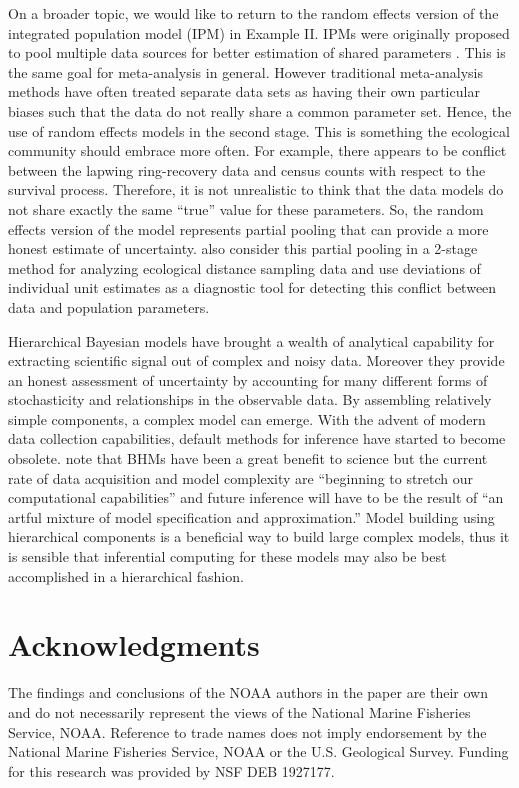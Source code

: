 \documentclass[12pt]{article}
\begin{document}
On a broader topic, we would like to return to the random effects version of the integrated population model (IPM) in Example II. IPMs were originally proposed to pool multiple data sources for better estimation of shared parameters \citep{schaub2011integrated}. This is the same goal for meta-analysis in general. However traditional meta-analysis methods have often treated separate data sets as having their own particular biases such that the data do not really share a common parameter set. Hence, the use of random effects models in the second stage. This is something the ecological community should embrace more often. For example, there appears to be conflict between the lapwing ring-recovery data and census counts with respect to the survival process. Therefore, it is not unrealistic to think that the data models do not share exactly the same ``true'' value for these parameters. So, the random effects version of the model represents partial pooling that can provide a more honest estimate of uncertainty. \cite{bravington2018reliable} also consider this partial pooling in a 2-stage method for analyzing ecological distance sampling data and use deviations of individual unit estimates as a diagnostic tool for detecting this conflict between data and population parameters. 

Hierarchical Bayesian models have brought a wealth of analytical capability for extracting scientific signal out of complex and noisy data. Moreover they provide an honest assessment of uncertainty by accounting for many different forms of stochasticity and relationships in the observable data. By assembling relatively simple components, a complex model can emerge. With the advent of modern data collection capabilities, default methods for inference have started to become obsolete. \citet{gelfand2015hierarchical} note that BHMs have been a great benefit to science but the current rate of data acquisition and model complexity are ``beginning to stretch our computational capabilities'' and future inference will have to be the result of ``an artful mixture of model specification and approximation.'' Model building using hierarchical components is a beneficial way to build large complex models, thus it is sensible that inferential computing for these models may also be best accomplished in a hierarchical fashion. 




\section*{Acknowledgments}
The findings and conclusions of the NOAA authors in the paper are their own and do not necessarily represent the views of the National Marine Fisheries Service, NOAA. Reference to trade names does not imply endorsement by the National Marine Fisheries Service, NOAA or the U.S. Geological Survey. Funding for this research was provided by NSF DEB 1927177.
\end{document}
